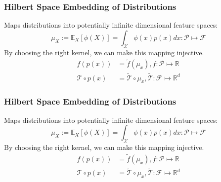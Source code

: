 \documentclass{beamer}
\begin{document}
    \begin{frame}
        \frametitle{Hilbert Space Embedding of Distributions}
        Maps distributions into potentially infinite dimensional feature spaces:
        \begin{equation}
            \mu_X := \mathbb{E}_X[\phi(X)] = \int_{\mathcal X} \phi(x)p(x)dx : \mathcal P \mapsto \mathcal F
        \end{equation}
        By choosing the right kernel, we can make this mapping injective.
        \begin{align}
            f(p(x)) &= \tilde{f}(\mu_x), f:\mathcal P \mapsto \mathbb R\\
            \mathcal{T} \circ p(x) &= \tilde{\mathcal T} \circ \mu_x, \tilde{\mathcal T}: \mathcal F \mapsto \mathbb R^d
        \end{align}
    \end{frame}

    \begin{frame}
        \frametitle{Hilbert Space Embedding of Distributions}
        Maps distributions into potentially infinite dimensional feature spaces:
        \begin{equation}
            \mu_X := \mathbb{E}_X[\phi(X)] = \int_{\mathcal X} \phi(x)p(x)dx : \mathcal P \mapsto \mathcal F
        \end{equation}
        By choosing the right kernel, we can make this mapping injective.
        \begin{align}
            f(p(x)) &= \tilde{f}(\mu_x), f:\mathcal P \mapsto \mathbb R\\
            \mathcal{T} \circ p(x) &= \tilde{\mathcal T} \circ \mu_x, \tilde{\mathcal T}: \mathcal F \mapsto \mathbb R^d
        \end{align}
    \end{frame}
\end{document}
